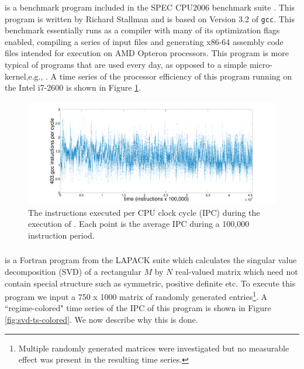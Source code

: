 \gcc is a benchmark program included in the SPEC CPU2006 benchmark suite \cite{spec}. This program is written by Richard Stallman and is based on Version 3.2 of {\tt gcc}. This benchmark essentially runs as a compiler with many of its optimization flags enabled, compiling a series of input files and generating x86-64 assembly code files intended for execution on AMD Opteron processors\cite{spec}. This program is more typical of programs that are used every day, as opposed to a simple micro-kernel,e.g., \col. A time series of the processor efficiency of this program running on the Intel i7-2600 is shown in Figure \ref{fig:gcc-ts}.

  \begin{figure}[t]
  \centering
    \includegraphics[width=\columnwidth]{figs/gccfullts}
    \caption{The instructions executed per CPU clock cycle (IPC) during the execution of \gcc. Each point is the average IPC during a 100,000 instruction period.}
    \label{fig:gcc-ts}
  \end{figure}

\subsubsection{}

\svd is a Fortran program from the LAPACK suite \cite{lapack} which calculates the singular value decomposition (SVD) of a rectangular $M$ by $N$  real-valued matrix which need not contain special structure such as symmetric, positive definite etc. To execute this program we input a 750 x 1000 matrix of randomly generated entries\footnote{Multiple randomly generated matrices were investigated but no measurable effect was present in the resulting time series.}. A ``regime-colored" time series of the IPC of this program is shown in Figure \ref{fig:svd-ts-colored}. We now describe why this is done.

